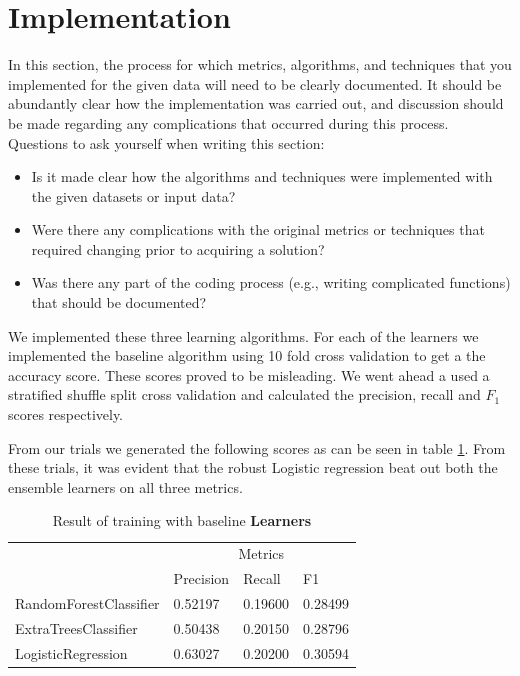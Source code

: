 \documentclass[twoside,openright,titlepage,numbers=noenddot,headinclude,%
               footinclude=true,cleardoublepage=empty,abstractoff,BCOR=5mm,%
               paper=a4,fontsize=11pt,ngerman,american]{scrreprt}
\numberwithin{theorem}{chapter}
\numberwithin{definition}{chapter}
\numberwithin{algorithm}{chapter}
\numberwithin{figure}{chapter}
\numberwithin{table}{chapter}
\numberwithin{equation}{chapter}
\begin{document}
\section*{Implementation}
In this section, the process for which metrics, algorithms, and techniques that you implemented for the given data will need to be clearly documented. It should be abundantly clear how the implementation was carried out, and discussion should be made regarding any complications that occurred during this process. Questions to ask yourself when writing this section:
\begin{itemize}%
\item Is it made clear how the algorithms and techniques were implemented with the given datasets or input data?
\item Were there any complications with the original metrics or techniques that required changing prior to acquiring a solution?
\item Was there any part of the coding process (e.g., writing complicated functions) that should be documented?

\end{itemize}
We implemented these three learning algorithms. For each of the learners we implemented the baseline algorithm using 10 fold cross validation to get a the accuracy score. These scores proved to be misleading. We went ahead a used a stratified shuffle split cross validation and calculated the precision, recall and $F_1$ scores respectively.

From our trials we generated the following scores as can be seen in table \ref{benchMarkScoresTable}. From these trials, it was evident that the robust Logistic regression beat out both the ensemble learners on all three metrics.

\setlength{\extrarowheight}{1.5pt}
\begin{table}[!htbp]
\caption{Result of training with baseline \textbf{Learners}} %
\centering %
\begin{tabular}{|p{6cm}|p{1.5cm}|p{1.5cm}|p{1.5cm}|} %
\hline %
& \multicolumn{3}{c|}{Metrics}\\[5pt]
\cline{2-4} 
& Precision & Recall & F1\\[0.5ex]
\hline %

RandomForestClassifier      &  0.52197&  0.19600&  0.28499\\ 
ExtraTreesClassifier        &  0.50438&  0.20150&  0.28796\\ 
LogisticRegression          &  0.63027&  0.20200&  0.30594\\ 

\hline %
\end{tabular}
\label{benchMarkScoresTable}
\end{table}
\end{document}

